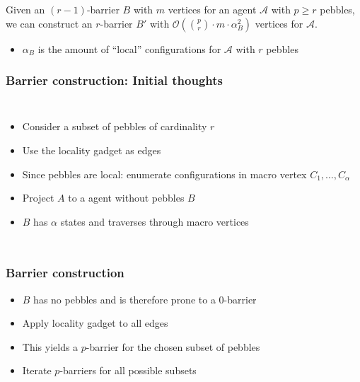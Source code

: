 \documentclass{beamer}
\begin{document}
\begin{frame}
  \begin{theorem}
    Given an $(r-1)$-barrier $B$ with $m$ vertices for an agent $\mathcal{A}$
    with $p\geq r$ pebbles, we can construct an $r$-barrier $B'$ with
    $\mathcal{O}(\binom{p}{r}\cdot m\cdot\alpha_{B}^{2})$ vertices for
    $\mathcal{A}$.
  \end{theorem}
  \begin{itemize}
    \item $\alpha_{B}$ is the amount of \enquote{local} configurations for
      $\mathcal{A}$ with $r$ pebbles
  \end{itemize}
\end{frame}

\begin{frame}
  \frametitle{Barrier construction: Initial thoughts}
  \begin{columns}
    \begin{itemize}
      \item Consider a subset of pebbles of cardinality $r$
      \item Use the locality gadget as edges
      \item Since pebbles are local: enumerate configurations in macro vertex
        $C_{1},\dots,C_{\alpha}$
      \item Project $A$ to a agent without pebbles $B$
      \item $B$ has $\alpha$ states and traverses through macro vertices
    \end{itemize}
    \resizebox{\textwidth}{!}{}
  \end{columns}
\end{frame}

\begin{frame}
  \frametitle{Barrier construction}
  \begin{itemize}
    \item $B$ has no pebbles and is therefore prone to a $0$-barrier
    \item Apply locality gadget to all edges
    \item This yields a $p$-barrier for the chosen subset of pebbles
    \item Iterate $p$-barriers for all possible subsets
      \begin{center}
        \resizebox{0.7\textwidth}{!}{}
      \end{center}
  \end{itemize}
\end{frame}
\end{document}
